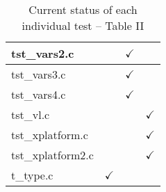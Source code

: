 \begin{table}[H]
\begin{tabular}{|l|c|c|c|}
tst\_vars2.c            &               & $\checkmark$  &               \\ \hline
tst\_vars3.c            &               & $\checkmark$  &               \\ \hline
tst\_vars4.c            &               & $\checkmark$  &               \\ \hline
tst\_vl.c               &               &               & $\checkmark$  \\ \hline
tst\_xplatform.c        &               &               & $\checkmark$  \\ \hline
tst\_xplatform2.c       &               &               & $\checkmark$  \\ \hline
t\_type.c               & $\checkmark$  &               &               \\ \hline
\hline
\end{tabular}
\caption{\label{tab:nc_test4_status_2} Current status of each individual test -- Table II}
\end{table}
